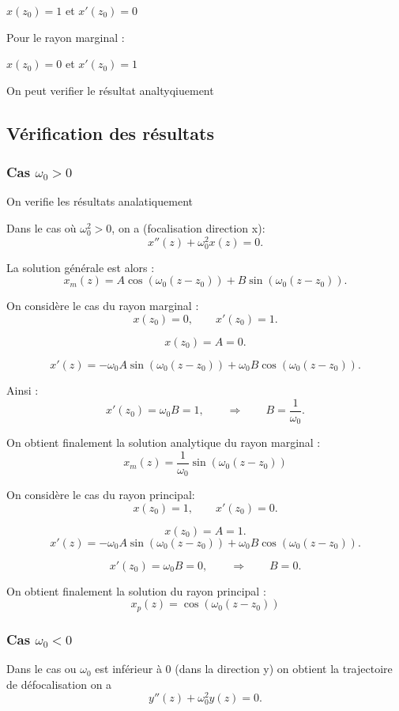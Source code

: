 \documentclass{report}
\begin{document}
$x(z_0) = 1$ et $x'(z_0) = 0$


Pour le rayon marginal : 

$x(z_0) = 0$ et  $x'(z_0) = 1$ 

On peut verifier le résultat analtyqiuement 

\subsection{Vérification des résultats}
\subsubsection{Cas $\omega_0 > 0$}

On verifie les résultats analatiquement

Dans le cas où $\omega_0^2 > 0$, on a (focalisation direction x):
\[
x''(z) + \omega_0^2 x(z) = 0 .
\]

La solution générale est alors :
\[
x_m(z) = A \cos\!\left(\omega_0 (z - z_0)\right)
+ B \sin\!\left(\omega_0 (z - z_0)\right).
\]

On considère le cas du rayon marginal :
\[
x(z_0) = 0, \qquad x'(z_0) = 1 .
\]

\[
x(z_0) = A = 0 .
\]

\[
x'(z) =
- \omega_0 A \sin\!\left(\omega_0 (z - z_0)\right)
+ \omega_0 B \cos\!\left(\omega_0 (z - z_0)\right).
\]

Ainsi :
\[
x'(z_0) = \omega_0 B = 1 ,
\qquad \Rightarrow \qquad
B = \frac{1}{\omega_0}.
\]

On obtient finalement la solution analytique du rayon marginal :
\[
\boxed{
x_m(z) = \frac{1}{\omega_0}
\sin\!\left(\omega_0 (z - z_0)\right)
}
\]

On considère  le cas du rayon principal:
\[
x(z_0) = 1, \qquad x'(z_0) = 0 .
\]

\[
x(z_0) = A = 1 .
\]
\[
x'(z) =
- \omega_0 A \sin\!\left(\omega_0 (z - z_0)\right)
+ \omega_0 B \cos\!\left(\omega_0 (z - z_0)\right).
\]

\[
x'(z_0) = \omega_0 B = 0 , \qquad \Rightarrow \qquad B = 0 .
\]

On obtient finalement la solution  du rayon principal :
\[
\boxed{
x_p(z) = \cos\!\left(\omega_0 (z - z_0)\right)
}
\]


\subsubsection{Cas $\omega_0 <0$}
Dans le cas ou $\omega_0$ est inférieur à 0 (dans la direction y) on obtient la trajectoire de défocalisation
on a 
\[
y''(z) + \omega_0^2 y(z) = 0 .
\]
\end{document}
